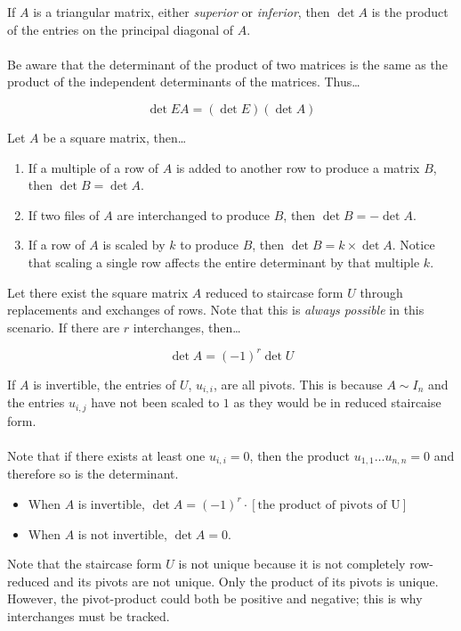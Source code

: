 \documentclass[12pt]{article}
\begin{document}
If $A$ is a triangular matrix, either \emph{superior} or \emph{inferior}, then $\det A$ is the product of the entries
on the principal diagonal of $A$. \\ \\

Be aware that the determinant of the product of two matrices is the same as the product
of the independent determinants of the matrices. Thus\dots

$$\det EA = (\det E)(\det A)$$

Let $A$ be a square matrix, then\dots

\begin{enumerate}
    \item If a multiple of a row of $A$ is added to another row to produce a matrix $B$,
    then $\det B = \det A$.
    \item If two files of $A$ are interchanged to produce $B$, then $\det B = -\det A$.
    \item If a row of $A$ is scaled by $k$ to produce $B$, then $\det B = k \times \det A$.
    Notice that scaling a single row affects the entire determinant by that multiple $k$.
\end{enumerate}

Let there exist the square matrix $A$ reduced to staircase form $U$ through replacements and exchanges of rows.
Note that this is \emph{always possible} in this scenario. If there are $r$ interchanges, then\dots

$$\det A = (-1)^r \det U$$

If $A$ is invertible, the entries of $U$, $u_{i,i}$, are all pivots.
This is because $A \sim I_n$ and the entries $u_{i,j}$ have not been scaled to $1$ as
they would be in reduced staircaise form. \\ \\

Note that if there exists at least one $u_{i,i} = 0$, then the product $u_{1,1} \dots u_{n,n} = 0$
and therefore so is the determinant.

\begin{itemize}
    \item When $A$ is invertible, $\det A = (-1)^r \cdot [\textrm{the product of pivots of U}]$
    \item When $A$ is not invertible, $\det A = 0$.
\end{itemize}

Note that the staircase form $U$ is not unique because it is not completely row-reduced and its pivots are not unique. Only the product of its pivots is unique. However, the pivot-product could both be positive and negative; this is why interchanges must be tracked. \\ \\
\end{document}
